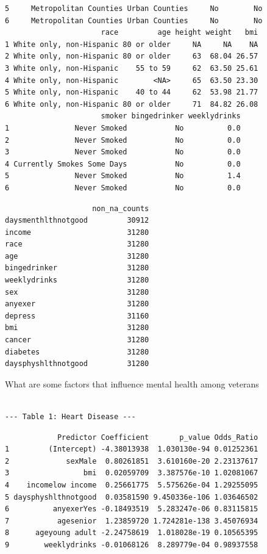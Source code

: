 \documentclass[
  10pt,
  letterpaper,
  DIV=11,
  numbers=noendperiod]{scrartcl}
\begin{document}
\begin{verbatim}
5     Metropolitan Counties Urban Counties     No        No
6     Metropolitan Counties Urban Counties     No        No
                      race         age height weight   bmi
1 White only, non-Hispanic 80 or older     NA     NA    NA
2 White only, non-Hispanic 80 or older     63  68.04 26.57
3 White only, non-Hispanic    55 to 59     62  63.50 25.61
4 White only, non-Hispanic        <NA>     65  63.50 23.30
5 White only, non-Hispanic    40 to 44     62  53.98 21.77
6 White only, non-Hispanic 80 or older     71  84.82 26.08
                      smoker bingedrinker weeklydrinks
1               Never Smoked           No          0.0
2               Never Smoked           No          0.0
3               Never Smoked           No          0.0
4 Currently Smokes Some Days           No          0.0
5               Never Smoked           No          1.4
6               Never Smoked           No          0.0
\end{verbatim}

\begin{verbatim}
                    non_na_counts
daysmenthlthnotgood         30912
income                      31280
race                        31280
age                         31280
bingedrinker                31280
weeklydrinks                31280
sex                         31280
anyexer                     31280
depress                     31160
bmi                         31280
cancer                      31280
diabetes                    31280
daysphyshlthnotgood         31280
\end{verbatim}

What are some factors that influence mental health among veterans

\begin{verbatim}

--- Table 1: Heart Disease ---
\end{verbatim}

\begin{verbatim}
            Predictor Coefficient       p_value Odds_Ratio
1         (Intercept) -4.38013938  1.030130e-94 0.01252361
2             sexMale  0.80261851  3.610160e-20 2.23137617
3                 bmi  0.02059709  3.387576e-10 1.02081067
4    incomelow income  0.25661775  5.575626e-04 1.29255095
5 daysphyshlthnotgood  0.03581590 9.450336e-106 1.03646502
6          anyexerYes -0.18493519  5.283247e-06 0.83115815
7           agesenior  1.23859720 1.724281e-138 3.45076934
8      ageyoung adult -2.24758619  1.018028e-19 0.10565395
9        weeklydrinks -0.01068126  8.289779e-04 0.98937558
\end{verbatim}
\end{document}
